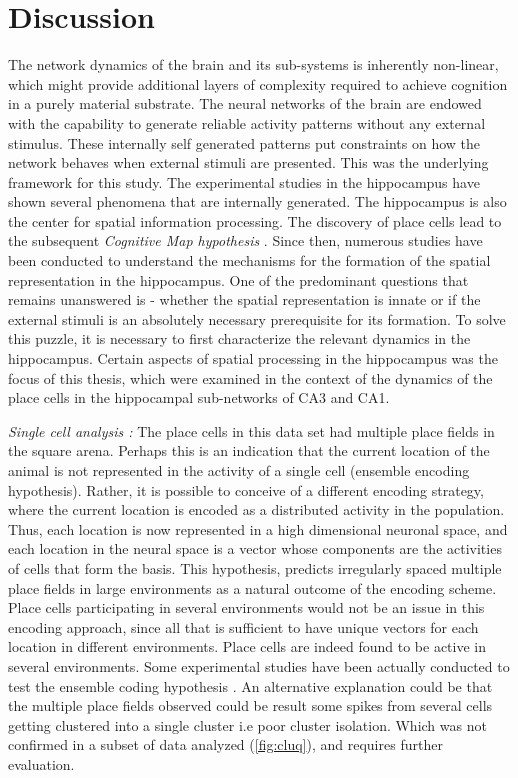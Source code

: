 \chapter{Discussion}

The network dynamics of the brain and its sub-systems is inherently non-linear, which might provide additional layers of complexity required to achieve cognition in a purely material substrate. The neural networks of the brain are endowed with the capability to generate reliable activity patterns without any external stimulus. These internally self generated patterns put constraints on how the network behaves when external stimuli are presented. This was the underlying framework for this study. The experimental studies in the hippocampus have shown several phenomena that are internally generated. The hippocampus is also the center for spatial information processing. The discovery of place cells \cite{O'Keefe1971a} lead to the subsequent \emph{Cognitive Map hypothesis} \cite{Street}. Since then, numerous studies have been conducted to understand the mechanisms for the formation of the spatial representation in the hippocampus. One of the predominant questions that remains unanswered is - whether the spatial representation is innate or if the external stimuli is an absolutely necessary prerequisite for its formation. To solve this puzzle, it is necessary to first characterize the relevant dynamics in the hippocampus. Certain aspects of spatial processing in the hippocampus was the focus of this thesis, which were examined in the context of the dynamics of the place cells in the hippocampal sub-networks of CA3 and CA1. 

\emph{Single cell analysis : }
The place cells in this data set had multiple place fields in the square arena. Perhaps this is an indication that the current location of the animal is not represented in the activity of a single cell (ensemble encoding hypothesis). Rather, it is possible to conceive of a different encoding strategy, where the current location is encoded as a distributed activity in the population. Thus, each location is now represented in a high dimensional neuronal space, and each location in the neural space is a vector whose components are the activities of cells that form the basis. This hypothesis, predicts irregularly spaced multiple place fields in large environments as a natural outcome of the encoding scheme. Place cells participating in several environments would not be an issue in this encoding approach, since all that is sufficient to have unique vectors for each location in different environments. Place cells are indeed found to be active in several environments\cite{Kubie1987}. Some experimental studies have been actually conducted to test the ensemble coding hypothesis \cite{Fenton2008}.  An alternative explanation could be that the multiple place fields observed could be result some spikes from several cells getting clustered into a single cluster i.e poor cluster isolation. Which was not confirmed in a subset of data analyzed (\autoref{fig:cluq}), and requires further evaluation. 

